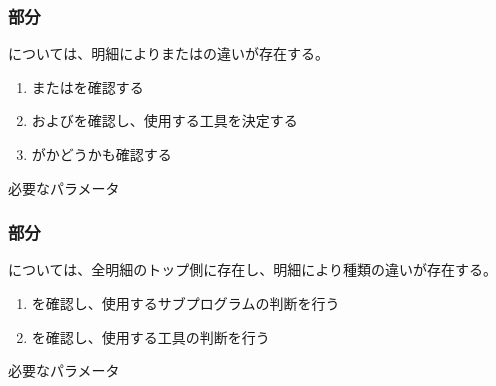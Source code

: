 \subsubsection{\OutcutMilling 部分}
\OutcutMilling については、明細により\OutcutExists または\OutcutType の違いが存在する。
\begin{enumerate}[label=\sarrow]
\item \TopOutcutExists または\BottomOutcutExists を確認する
\item \TopOutcutType および\BottomOutcutType を確認し、使用する工具を決定する
\item \nameOutcut が\CurvedOutcut かどうかも確認する
\end{enumerate}
\begin{Parameter}{必要なパラメータ}
\PMTopOutcutExists%
\PMBottomOutcutExists%
\PMTopOutcutType%
\PMBottomOutcutType%
\end{Parameter}

\subsubsection{\KeywayMilling 部分}
\KeywayMilling については、全明細のトップ側に存在し、明細により種類の違いが存在する。
\begin{enumerate}[label=\sarrow]
\item \nameKeywayType を確認し、使用するサブプログラムの判断を行う
\item \nameKeywayWidth を確認し、使用する工具の判断を行う
\end{enumerate}
\begin{Parameter}{必要なパラメータ}
\PMKeywayType%
\PMTopOutcutExists%
\PMKeywayWidth%
\end{Parameter}

